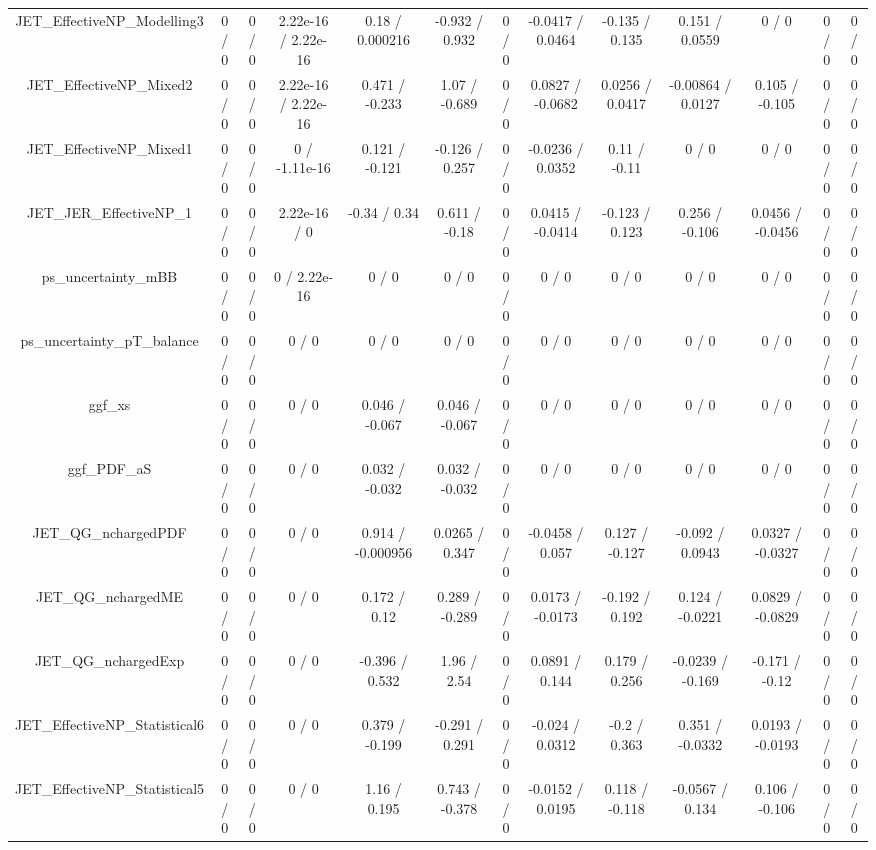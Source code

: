 \documentclass[10pt]{article}
\begin{document}
\begin{table}[htbp]
\begin{center}
\begin{tabular}{|c|c|c|c|c|c|c|c|c|c|c|c|c|}
  JET_EffectiveNP_Modelling3 & 0 / 0 & 0 / 0 & 2.22e-16 / 2.22e-16 & 0.18 / 0.000216 & -0.932 / 0.932 & 0 / 0 & -0.0417 / 0.0464 & -0.135 / 0.135 & 0.151 / 0.0559 & 0 / 0 & 0 / 0 & 0 / 0 \\ 
  JET_EffectiveNP_Mixed2 & 0 / 0 & 0 / 0 & 2.22e-16 / 2.22e-16 & 0.471 / -0.233 & 1.07 / -0.689 & 0 / 0 & 0.0827 / -0.0682 & 0.0256 / 0.0417 & -0.00864 / 0.0127 & 0.105 / -0.105 & 0 / 0 & 0 / 0 \\ 
  JET_EffectiveNP_Mixed1 & 0 / 0 & 0 / 0 & 0 / -1.11e-16 & 0.121 / -0.121 & -0.126 / 0.257 & 0 / 0 & -0.0236 / 0.0352 & 0.11 / -0.11 & 0 / 0 & 0 / 0 & 0 / 0 & 0 / 0 \\ 
  JET_JER_EffectiveNP_1 & 0 / 0 & 0 / 0 & 2.22e-16 / 0 & -0.34 / 0.34 & 0.611 / -0.18 & 0 / 0 & 0.0415 / -0.0414 & -0.123 / 0.123 & 0.256 / -0.106 & 0.0456 / -0.0456 & 0 / 0 & 0 / 0 \\ 
  ps_uncertainty_mBB & 0 / 0 & 0 / 0 & 0 / 2.22e-16 & 0 / 0 & 0 / 0 & 0 / 0 & 0 / 0 & 0 / 0 & 0 / 0 & 0 / 0 & 0 / 0 & 0 / 0 \\ 
  ps_uncertainty_pT_balance & 0 / 0 & 0 / 0 & 0 / 0 & 0 / 0 & 0 / 0 & 0 / 0 & 0 / 0 & 0 / 0 & 0 / 0 & 0 / 0 & 0 / 0 & 0 / 0 \\ 
  ggf_xs & 0 / 0 & 0 / 0 & 0 / 0 & 0.046 / -0.067 & 0.046 / -0.067 & 0 / 0 & 0 / 0 & 0 / 0 & 0 / 0 & 0 / 0 & 0 / 0 & 0 / 0 \\ 
  ggf_PDF_aS & 0 / 0 & 0 / 0 & 0 / 0 & 0.032 / -0.032 & 0.032 / -0.032 & 0 / 0 & 0 / 0 & 0 / 0 & 0 / 0 & 0 / 0 & 0 / 0 & 0 / 0 \\ 
  JET_QG_nchargedPDF & 0 / 0 & 0 / 0 & 0 / 0 & 0.914 / -0.000956 & 0.0265 / 0.347 & 0 / 0 & -0.0458 / 0.057 & 0.127 / -0.127 & -0.092 / 0.0943 & 0.0327 / -0.0327 & 0 / 0 & 0 / 0 \\ 
  JET_QG_nchargedME & 0 / 0 & 0 / 0 & 0 / 0 & 0.172 / 0.12 & 0.289 / -0.289 & 0 / 0 & 0.0173 / -0.0173 & -0.192 / 0.192 & 0.124 / -0.0221 & 0.0829 / -0.0829 & 0 / 0 & 0 / 0 \\ 
  JET_QG_nchargedExp & 0 / 0 & 0 / 0 & 0 / 0 & -0.396 / 0.532 & 1.96 / 2.54 & 0 / 0 & 0.0891 / 0.144 & 0.179 / 0.256 & -0.0239 / -0.169 & -0.171 / -0.12 & 0 / 0 & 0 / 0 \\ 
  JET_EffectiveNP_Statistical6 & 0 / 0 & 0 / 0 & 0 / 0 & 0.379 / -0.199 & -0.291 / 0.291 & 0 / 0 & -0.024 / 0.0312 & -0.2 / 0.363 & 0.351 / -0.0332 & 0.0193 / -0.0193 & 0 / 0 & 0 / 0 \\ 
  JET_EffectiveNP_Statistical5 & 0 / 0 & 0 / 0 & 0 / 0 & 1.16 / 0.195 & 0.743 / -0.378 & 0 / 0 & -0.0152 / 0.0195 & 0.118 / -0.118 & -0.0567 / 0.134 & 0.106 / -0.106 & 0 / 0 & 0 / 0 \\ 

\end{tabular}
\end{center}
\end{table}
\end{document}
